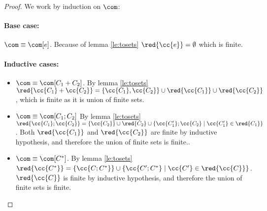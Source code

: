 \begin{proof}
  We work by induction on \(\com\):

  \noindent
  \paragraph*{Base case:\\}
  
  \(\com \equiv \com[e]\). Because of lemma \ref{le:tosets}
  \(\red{\cc{e}} = \emptyset\) which is finite.

  \noindent
  \paragraph*{Inductive cases:\\}
  \begin{itemize}
  \item \(\com \equiv \com[C_1 + C_2]\). By lemma \ref{le:tosets}
    \(\red{\cc{C_1} + \cc{C_2}} = \{\cc{C_1}, \cc{C_2}\} \cup
    \red{\cc{C_1}} \cup \red{\cc{C_2}}\), which is finite as it is
    union of finite sets.
  \item \(\com \equiv \com[C_1;C_2]\) By lemma \ref{le:tosets}
    \(\red{\cc{C_1}; \cc{C_2}} =
    \{\cc{C_2}\}\cup\red{C_2}\cup\{\cc{C_1'};\cc{C_2} \mid
    \cc{C_1'}\in\red{C_1}\}\). Both \(\red{\cc{C_1}}\) and
    \(\red{\cc{C_2}}\) are finite by inductive hypothesis, and
    therefore the union of finite sets is finite..
  \item \(\com \equiv \com[C^*]\). By lemma \ref{le:tosets}
    \(\red{\cc{C^*}} = \{\cc{C;C^*}\} \cup \{\cc{C';C^*} \mid
    \cc{C'}\in\red{\cc{C}}\}\). \(\red{\cc{C}}\) is finite by
    inductive hypothesis, and therefore the union of finite sets is
    finite.
  \end{itemize}
\end{proof}
